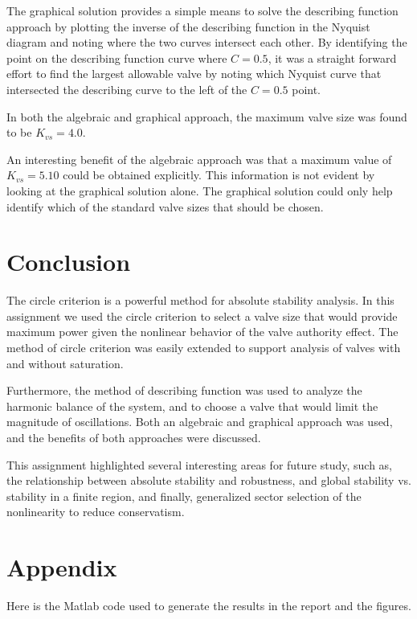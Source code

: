 \documentclass[a4paper, titlepage]{article}
\begin{document}
The graphical solution provides a simple means to solve the describing function approach by plotting the inverse of the describing function in the Nyquist diagram and noting where the two curves intersect each other. By identifying the point on the describing function curve where $C=0.5$, it was a straight forward effort to find the largest allowable valve by noting which Nyquist curve that intersected the describing curve to the left of the $C=0.5$ point.

In both the algebraic and graphical approach, the maximum valve size was found to be $K_{vs}=4.0$.

An interesting benefit of the algebraic approach was that a maximum value of $K_{vs}=5.10$ could be obtained explicitly. This information is not evident by looking at the graphical solution alone.  The graphical solution could only help identify which of the standard valve sizes that should be chosen.    

 
\section{Conclusion}

The circle criterion is a powerful method for absolute stability analysis.  In this assignment we used the circle criterion to select a valve size that would provide maximum power given the nonlinear behavior of the valve authority effect.  The method of circle criterion was easily extended to support analysis of valves with and without saturation.

Furthermore, the method of describing function was used to analyze the harmonic balance of the system, and to choose a valve that would limit the magnitude of oscillations.  Both an algebraic and graphical approach was used, and the benefits of both approaches were discussed.

This assignment highlighted several interesting areas for future study, such as, the relationship between absolute stability and robustness, and global stability vs. stability in a finite region, and finally, generalized sector selection of the nonlinearity to reduce conservatism.   



\clearpage


\clearpage
\appendix

\section{Appendix}
Here is the Matlab code used to generate the results in the report and the figures.


\end{document}
